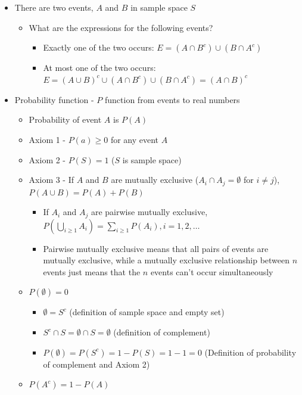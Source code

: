 \documentclass{article}
\begin{document}
\begin{itemize}
\begin{itemize}
    \end{itemize}
    \item There are two events, $A$ and $B$ in sample space $S$
    \begin{itemize}
        \item What are the expressions for the following events?
        \begin{itemize}
            \item Exactly one of the two occurs: $E = (A \cap B^c) \cup (B \cap A^c)$
            \item At most one of the two occurs: $E = (A \cup B)^c \cup (A \cap B^c) \cup (B \cap A^c) = (A \cap B)^c$
        \end{itemize}
    \end{itemize}
    \item Probability function - $P$ function from events to real numbers
    \begin{itemize}
        \item Probability of event $A$ is $P(A)$
        \item Axiom 1 - $P(a) \ge 0$ for any event $A$
        \item Axiom 2 - $P(S)=1$ ($S$ is sample space)
        \item Axiom 3 - If $A$ and $B$ are mutually exclusive ($A_i \cap A_j = \emptyset$ for $i \neq j$), $P(A \cup B) = P(A) + P(B)$
        \begin{itemize}
            \item If $A_i$ and $A_j$ are pairwise mutually exclusive, $P(\bigcup_{i \ge 1} A_i) = \sum_{i \ge 1} P(A_i), i=1,2,\dots$
            \item Pairwise mutually exclusive means that all pairs of events are mutually exclusive, while a mutually exclusive relationship between $n$ events just means that the $n$ events can't occur simultaneously
        \end{itemize}
        \item $P(\emptyset)=0$
        \begin{itemize}
            \item $\emptyset = S^c$ (definition of sample space and empty set)
            \item $S^c \cap S = \emptyset \cap S = \emptyset$ (definition of complement)
            \item $P(\emptyset) = P(S^c) = 1-P(S) = 1-1 = 0$ (Definition of probability of complement and Axiom 2)
        \end{itemize}
        \item $P(A^c)=1-P(A)$

\end{itemize}
\end{itemize}
\end{document}
